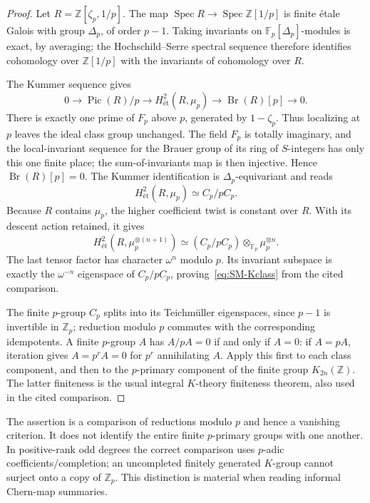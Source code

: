 \documentclass[11pt,a4paper]{article}
\theoremstyle{definition}\newtheorem{definition}[theorem]{Definition}
\theoremstyle{remark}\newtheorem{remark}[theorem]{Remark}
\begin{document}
\begin{proof}
Let $R=\mathbb Z[\zeta_p,1/p]$.  The map
$\operatorname{Spec}R\to\operatorname{Spec}\mathbb Z[1/p]$ is finite
\'etale Galois with group $\Delta_p$, of order $p-1$.  Taking invariants
on $\mathbb F_p[\Delta_p]$-modules is exact, by averaging; the
Hochschild--Serre spectral sequence therefore identifies cohomology over
$\mathbb Z[1/p]$ with the invariants of cohomology over $R$.

The Kummer sequence gives
\[
 0\longrightarrow\operatorname{Pic}(R)/p
 \longrightarrow H^2_{\text{ét}}(R,\mu_p)
 \longrightarrow\operatorname{Br}(R)[p]\longrightarrow0.
\]
There is exactly one prime of $F_p$ above $p$, generated by
$1-\zeta_p$.  Thus localizing at $p$ leaves the ideal class group
unchanged.  The field $F_p$ is totally imaginary, and the local-invariant
sequence for the Brauer group of its ring of $S$-integers has only this
one finite place; the sum-of-invariants map is then injective.  Hence
$\operatorname{Br}(R)[p]=0$.  The Kummer identification is
$\Delta_p$-equivariant and reads
\[
 H^2_{\text{ét}}(R,\mu_p)
       \simeq C_p/pC_p.
\]
Because $R$ contains $\mu_p$, the higher coefficient twist is constant
over $R$.  With its descent action retained, it gives
\[
 H^2_{\text{ét}}(R,\mu_p^{\otimes(n+1)})
 \simeq (C_p/pC_p)\otimes_{\mathbb F_p}\mu_p^{\otimes n}.
\]
The last tensor factor has character $\omega^n$ modulo $p$.
Its invariant subspace is exactly the $\omega^{-n}$ eigenspace of
$C_p/pC_p$, proving~\eqref{eq:SM-Kclass} from the cited comparison.

The finite $p$-group $C_p$ splits into its Teichm\"uller eigenspaces,
since $p-1$ is invertible in $\mathbb Z_p$; reduction modulo $p$ commutes
with the corresponding idempotents.  A finite $p$-group $A$ has
$A/pA=0$ if and only if $A=0$: if $A=pA$, iteration gives
$A=p^rA=0$ for $p^r$ annihilating $A$.  Apply this first to each class
component, and then to the $p$-primary component of the finite group
$K_{2n}(\mathbb Z)$.  The latter finiteness is the usual integral
$K$-theory finiteness theorem, also used in the cited comparison.
\end{proof}

The assertion is a comparison of reductions modulo $p$ and hence a
vanishing criterion.  It does not identify the entire finite
$p$-primary groups with one another.  In positive-rank odd degrees the
correct comparison uses $p$-adic coefficients/completion; an
uncompleted finitely generated $K$-group cannot surject onto a copy of
$\mathbb Z_p$.  This distinction is material when reading informal
Chern-map summaries.
\end{document}
